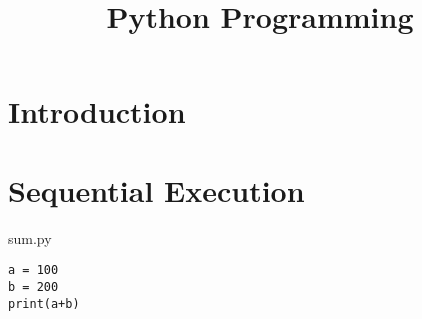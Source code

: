 \documentclass[aspectratio=1610,t]{beamer}
\author{}
\title{Python Programming}
\begin{document}

\makeTitleSlide{}

\section{Introduction}
\makeTableOfContents



\section{Sequential Execution}

\begin{pframe}
 \begin{center}
  
 \end{center}
\end{pframe}


\begin{pframe}
 \begin{minipage}{0.37\textwidth}
  \begin{center}
   
  \end{center}
 \end{minipage}%
 \begin{minipage}{0.57\textwidth}
  \begin{pythonfile}{sum.py}
   \begin{verbatim}
a = 100
b = 200
print(a+b)
   \end{verbatim}
  \end{pythonfile}
 \begin{terminal}
  \end{terminal}
 \end{minipage}
\end{pframe}
\end{document}
